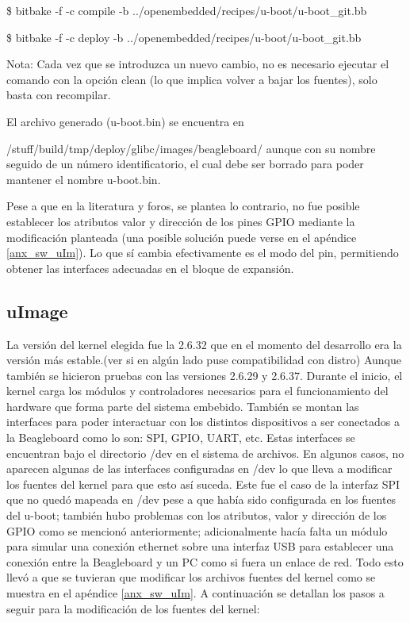 \centerline{\$ bitbake -f -c compile -b ../openembedded/recipes/u-boot/u-boot\_git.bb}

\centerline{\$ bitbake -f -c deploy -b ../openembedded/recipes/u-boot/u-boot\_git.bb}

\bigskip
Nota: Cada vez que se introduzca un nuevo cambio, no es necesario ejecutar el comando con la opción clean (lo que implica volver a bajar los fuentes), solo basta con recompilar.

\bigskip
El archivo generado (u-boot.bin) se encuentra en 

/stuff/build/tmp/deploy/glibc/images/beagleboard/ aunque con su nombre seguido de un número identificatorio, el cual debe ser borrado para poder mantener el nombre u-boot.bin.

\bigskip
Pese a que en la literatura y foros, se plantea lo contrario, no fue posible establecer los atributos valor y dirección de los pines GPIO mediante la modificación planteada (una posible solución puede verse en el apéndice \ref{anx_sw_uIm}). Lo que sí cambia efectivamente es el modo del pin, permitiendo obtener las interfaces adecuadas en el bloque de expansión.

\subsection{uImage}
La versión del kernel elegida fue la 2.6.32 que en el momento del desarrollo era la versión más estable.(ver si en algún lado puse compatibilidad con distro) Aunque también se hicieron pruebas con las versiones 2.6.29 y 2.6.37.
Durante el inicio, el kernel carga los módulos y controladores necesarios para el funcionamiento del 
hardware que forma parte del sistema embebido. También se montan las interfaces para poder interactuar con los distintos dispositivos a ser conectados a la Beagleboard como lo son: SPI, GPIO, UART, etc. Estas interfaces se encuentran bajo el directorio /dev en el sistema de archivos. En algunos casos, no aparecen algunas de las interfaces configuradas en /dev lo que lleva a modificar los fuentes del kernel para que esto así suceda. Este fue el caso de la interfaz SPI que no quedó mapeada en /dev pese a que había sido configurada en los fuentes del u-boot; también hubo problemas con los atributos, valor y dirección de los GPIO como se mencionó anteriormente; adicionalmente hacía falta un módulo para simular una conexión ethernet sobre una interfaz USB para establecer una conexión entre la Beagleboard y un PC como si fuera un enlace de red. 
Todo esto llevó a que se tuvieran que modificar los archivos fuentes del kernel como se muestra en el apéndice \ref{anx_sw_uIm}.
A continuación se detallan los pasos a seguir para la modificación de los fuentes del kernel:
 
